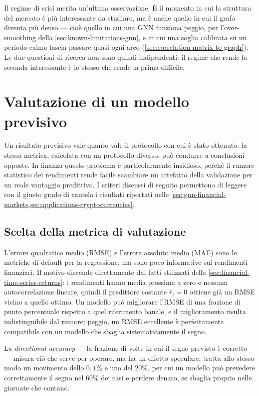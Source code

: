 Il regime di crisi merita un'ultima osservazione. È il momento in cui la struttura del mercato è più interessante da studiare, ma è anche quello in cui il grafo diventa più denso — cioè quello in cui una GNN funziona peggio, per l'over-smoothing della \cref{sec:known-limitations-gnn}, e in cui una soglia calibrata su un periodo calmo lascia passare quasi ogni arco (\cref{sec:correlation-matrix-to-graph}). Le due questioni di ricerca non sono quindi indipendenti: il regime che rende la seconda interessante è lo stesso che rende la prima difficile.

\section{Valutazione di un modello previsivo}
\label{sec:evaluation-metrics-methodological-pitfalls}

Un risultato previsivo vale quanto vale il protocollo con cui è stato ottenuto: la stessa metrica, calcolata con un protocollo diverso, può condurre a conclusioni opposte. In finanza questo problema è particolarmente insidioso, perché il rumore statistico dei rendimenti rende facile scambiare un artefatto della validazione per un reale vantaggio predittivo. I criteri discussi di seguito permettono di leggere con il giusto grado di cautela i risultati riportati nelle \cref{sec:gnn-financial-markets,sec:applications-cryptocurrencies}.

\subsection{Scelta della metrica di valutazione}

L'errore quadratico medio (RMSE) e l'errore assoluto medio (MAE) sono le metriche di default per la regressione, ma sono poco informative sui rendimenti finanziari. Il motivo discende direttamente dai fatti stilizzati della \cref{sec:financial-time-series-returns}: i rendimenti hanno media prossima a zero e nessuna autocorrelazione lineare, quindi il predittore costante $\hat r_t = 0$ ottiene già un RMSE vicino a quello ottimo. Un modello può migliorare l'RMSE di una frazione di punto percentuale rispetto a quel riferimento banale, e il miglioramento risulta indistinguibile dal rumore; peggio, un RMSE eccellente è perfettamente compatibile con un modello che sbaglia sistematicamente il segno.

La \emph{directional accuracy} — la frazione di volte in cui il segno previsto è corretto — misura ciò che serve per operare, ma ha un difetto speculare: tratta allo stesso modo un movimento dello $0{,}1\%$ e uno del $20\%$, per cui un modello può prevedere correttamente il segno nel $60\%$ dei casi e perdere denaro, se sbaglia proprio nelle giornate che contano.

